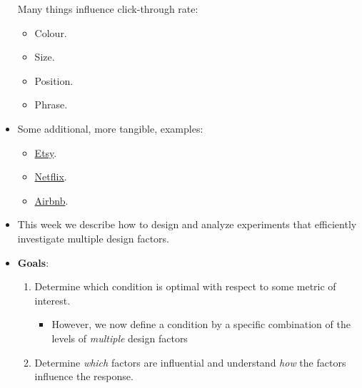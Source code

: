 \begin{itemize}
\begin{figure}[!htbp]
            \end{figure}

            Many things influence click-through rate:
            \begin{itemize}
                  \item Colour.
                  \item Size.
                  \item Position.
                  \item Phrase.
            \end{itemize}
      \item Some additional, more tangible, examples:
            \begin{itemize}
                  \item \href{https://goodui.org/leaks/how-etsys-product-page-design-evolved-between-2019-and-2020/}{Etsy}.
                  \item \href{https://goodui.org/leaks/netflix-a-b-tests-4-secondary-choices-all-of-which-get-rejected/}{Netflix}.
                  \item \href{https://goodui.org/leaks/airbnb-a-b-tests-and-rejects-a-natural-language-form/}{Airbnb}.
            \end{itemize}
      \item This week we describe how to design and analyze experiments that efficiently investigate multiple
            design factors.
      \item \textbf{Goals}:
            \begin{enumerate}[1.]
                  \item Determine which condition is optimal with respect to some metric of interest.
                        \begin{itemize}
                              \item However, we now define a condition by a specific combination of the levels of \emph{multiple} design factors
                        \end{itemize}
                  \item Determine \emph{which} factors are influential and understand \emph{how} the factors influence the response.
            \end{enumerate}
\end{itemize}
